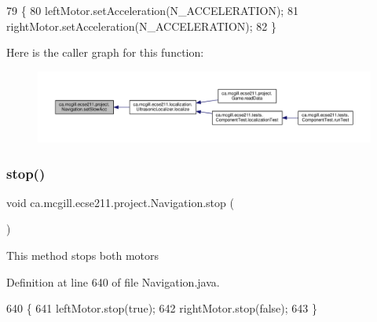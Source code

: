 \begin{DoxyCode}
79                            \{
80     leftMotor.setAcceleration(N\_ACCELERATION);
81     rightMotor.setAcceleration(N\_ACCELERATION);
82   \}
\end{DoxyCode}
Here is the caller graph for this function\+:\nopagebreak
\begin{figure}[H]
\begin{center}
\leavevmode
\includegraphics[width=350pt]{classca_1_1mcgill_1_1ecse211_1_1project_1_1_navigation_ab01db7b8a871acd45e7dd16922abc15e_icgraph}
\end{center}
\end{figure}
\mbox{\label{classca_1_1mcgill_1_1ecse211_1_1project_1_1_navigation_ae8530d181ffd790ff9dea5eeab54b1a1}} 
\subsubsection{\texorpdfstring{stop()}{stop()}}
{\footnotesize\ttfamily void ca.\+mcgill.\+ecse211.\+project.\+Navigation.\+stop (\begin{DoxyParamCaption}{ }\end{DoxyParamCaption})}

This method stops both motors 

Definition at line 640 of file Navigation.\+java.


\begin{DoxyCode}
640                      \{
641     leftMotor.stop(\textcolor{keyword}{true});
642     rightMotor.stop(\textcolor{keyword}{false});
643   \}
\end{DoxyCode}
\mbox{\label{classca_1_1mcgill_1_1ecse211_1_1project_1_1_navigation_a3d8354490a2d8c36090d794c25d33421}} 
